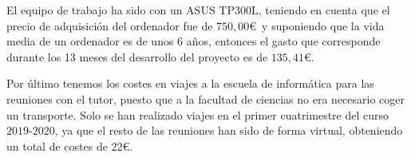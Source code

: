 \begin{table}[h]
	\begin{center}
	\centering
	\end{center}
	\caption{Desglose de los costes en recursos humanos}
	\label{tab:coste-rh}
\end{table}

El equipo de trabajo ha sido con un ASUS TP$300$L, teniendo en cuenta que el precio de adquisición del ordenador fue de $750,00$\euro\ y suponiendo que la vida media de un ordenador es de unos 6 años, entonces el gasto que corresponde durante los 13 meses del desarrollo del proyecto es de  $135,41$\euro.



Por último tenemos los costes en viajes a la escuela de informática para las reuniones con el tutor, puesto que a la facultad de ciencias no era necesario coger un transporte. Solo se han realizado viajes en el primer cuatrimestre del curso $2019$-$2020$, ya que el resto de las reuniones han sido de forma virtual, obteniendo un total de costes de $22$\euro.


